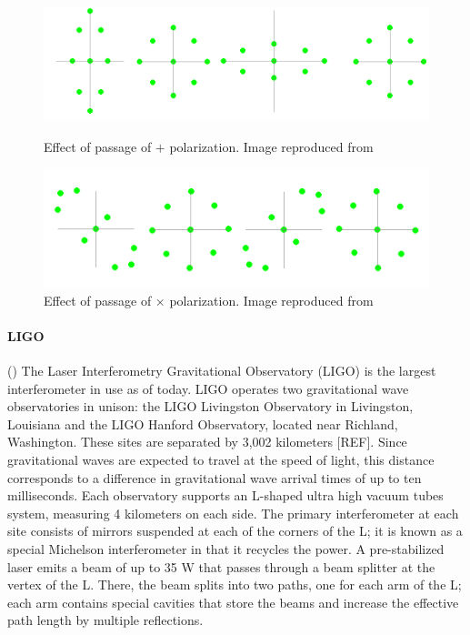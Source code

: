 \documentclass[epsf]{article}
\begin{document}
\begin{figure}[ht]
\begin{minipage}[b]{0.5\linewidth}
\centering
\includegraphics[scale=0.35]{plus.png}
\caption{Effect of passage of $+$ polarization. Image reproduced from \cite{ian}}
\label{fig:massesplus}
\end{minipage}
\hspace{0.5cm}
\begin{minipage}[b]{0.5\linewidth}
\centering
\includegraphics[scale=0.35]{cross.png}
\caption{Effect of passage of $\times$ polarization. Image reproduced from \cite{ian}}
\label{fig:massescross}
\end{minipage}
\end{figure}

\paragraph{LIGO}(\cite{ligoweb,LIGOIFO,LLOweb,LHOweb,abbott2006,abbott2007,ian,cre}) The Laser Interferometry Gravitational Observatory (LIGO) is the largest interferometer in use as of today. LIGO operates two gravitational wave observatories in unison: the LIGO Livingston Observatory in Livingston, Louisiana and the LIGO Hanford Observatory, located near Richland, Washington. These sites are separated by 3,002 kilometers [REF]. Since gravitational waves are expected to travel at the speed of light, this distance corresponds to a difference in gravitational wave arrival times of up to ten milliseconds. Each observatory supports an L-shaped ultra high vacuum tubes system, measuring 4 kilometers on each side. The primary interferometer at each site consists of mirrors suspended at each of the corners of the L; it is known as a special Michelson interferometer in that it recycles the power. A pre-stabilized laser emits a beam of up to 35 W that passes through a beam splitter at the vertex of the L. There, the beam splits into two paths, one for each arm of the L; each arm contains special cavities that store the beams and increase the effective path length by multiple reflections.
\end{document}
